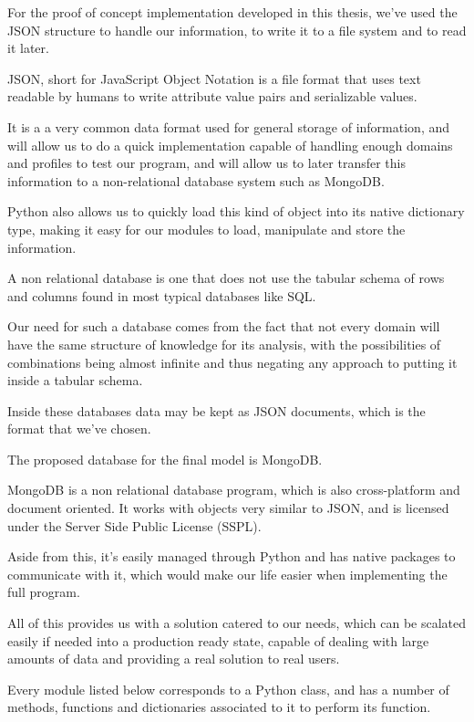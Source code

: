 For the proof of concept implementation developed in this thesis, we've used the JSON structure to handle our information, to write it to a file system and to read it later.

JSON, short for JavaScript Object Notation is a file format that uses text readable by humans to write attribute value pairs and serializable values. 

It is a a very common data format used for general storage of information, and will allow us to do a quick implementation capable of handling enough domains and profiles to test our program, and will allow us to later transfer this information to a non-relational database system such as MongoDB.

Python also allows us to quickly load this kind of object into its native dictionary type, making it easy for our modules to load, manipulate and store the information.

A non relational database is one that does not use the tabular schema of rows and columns found in most typical databases like SQL.

Our need for such a database comes from the fact that not every domain will have the same structure of knowledge for its analysis, with the possibilities of combinations being almost infinite and thus negating any approach to putting it inside a tabular schema.

Inside these databases data may be kept as JSON documents, which is the format that we've chosen.

The proposed database for the final model is MongoDB. 

MongoDB is a non relational database program, which is also cross-platform and document oriented. It works with objects very similar to JSON, and is licensed under the Server Side Public License (SSPL). 

Aside from this, it's easily managed through Python and has native packages to communicate with it, which would make our life easier when implementing the full program.

All of this provides us with a solution catered to our needs, which can be scalated easily if needed into a production ready state, capable of dealing with large amounts of data and providing a real solution to real users.

Every module listed below corresponds to a Python class, and has a number of methods, functions and dictionaries associated to it to perform its function.

